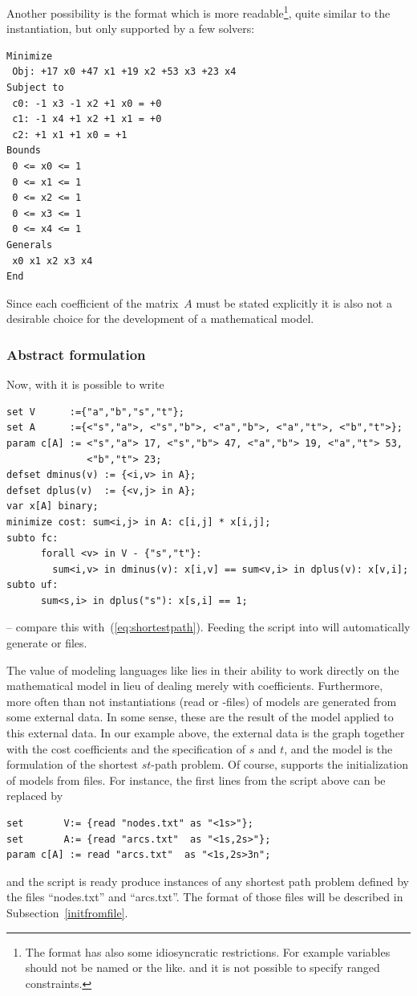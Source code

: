 \bigskip
\noindent Another possibility is the \lpf format \cite{CPlex80} which
is more readable\footnote{ The \lpf format has also some idiosyncratic
  restrictions. For example variables should not be named 
  or the like. and it is not possible to specify ranged
  constraints.}, quite similar to the instantiation,
but only supported by a few solvers:
{ \small
\begin{verbatim}
Minimize
 Obj: +17 x0 +47 x1 +19 x2 +53 x3 +23 x4
Subject to
 c0: -1 x3 -1 x2 +1 x0 = +0
 c1: -1 x4 +1 x2 +1 x1 = +0
 c2: +1 x1 +1 x0 = +1
Bounds
 0 <= x0 <= 1
 0 <= x1 <= 1
 0 <= x2 <= 1
 0 <= x3 <= 1
 0 <= x4 <= 1
Generals
 x0 x1 x2 x3 x4
End
\end{verbatim}
}
\noindent Since each coefficient of the matrix~$A$ must be stated
explicitly it is also not a desirable choice for the development of a
mathematical model.

\subsubsection{Abstract formulation}

Now, with \zimpl it is possible to write

{\small
\begin{verbatim}
set V      :={"a","b","s","t"};
set A      :={<"s","a">, <"s","b">, <"a","b">, <"a","t">, <"b","t">};
param c[A] := <"s","a"> 17, <"s","b"> 47, <"a","b"> 19, <"a","t"> 53,
              <"b","t"> 23;
defset dminus(v) := {<i,v> in A};
defset dplus(v)  := {<v,j> in A};
var x[A] binary;
minimize cost: sum<i,j> in A: c[i,j] * x[i,j];
subto fc:
      forall <v> in V - {"s","t"}:
        sum<i,v> in dminus(v): x[i,v] == sum<v,i> in dplus(v): x[v,i];
subto uf:
      sum<s,i> in dplus("s"): x[s,i] == 1;
\end{verbatim}
}

\noindent -- compare this with~(\ref{eq:shortestpath}). Feeding the
script into \zimpl will automatically generate \mps or \lpf files.


\medskip

The value of modeling languages like \zimpl lies in their ability to
work directly on the mathematical model in lieu of dealing merely with
coefficients. Furthermore, more often than not instantiations (read
\lpf or \mps-files) of models are generated from some external
data. In some sense, these are the result of the model applied to this
external data. In our example above, the external data is the graph
together with the cost coefficients and the specification of $s$ and
$t$, and the model is the formulation of the shortest $st$-path
problem. Of course, \zimpl supports the initialization of models
from files. For instance, the first lines from the \zimpl script above
can be replaced by {\small
\begin{verbatim}
set       V:= {read "nodes.txt" as "<1s>"};
set       A:= {read "arcs.txt"  as "<1s,2s>"};
param c[A] := read "arcs.txt"  as "<1s,2s>3n";
\end{verbatim}
} and the \zimpl script is ready produce instances of any shortest
path problem defined by the files ``nodes.txt'' and ``arcs.txt''. The
format of those files will be described in Subsection~\ref{initfromfile}.

